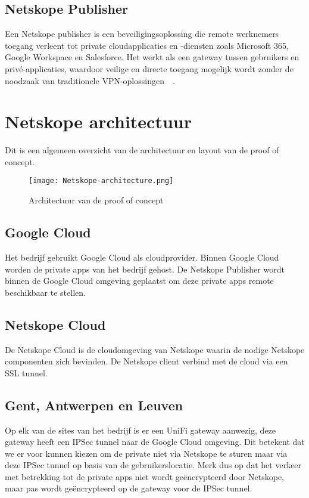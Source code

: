 \subsection{Netskope Publisher}
Een Netskope publisher is een beveiligingsoplossing die remote werknemers toegang verleent tot private cloudapplicaties en -diensten zoals Microsoft 365, Google Workspace en Salesforce. Het werkt als een gateway tussen gebruikers en privé-applicaties, waardoor veilige en directe toegang mogelijk wordt zonder de noodzaak van traditionele VPN-oplossingen~\autocite{Netskope2025-6}~\autocite{Netskope2025-7}.

\section{Netskope architectuur}
Dit is een algemeen overzicht van de architectuur en layout van de proof of concept. 
\begin{figure}
    \centering
    \texttt{[image: Netskope-architecture.png]}
    \caption[]{Architectuur van de proof of concept}
    \label{fig:poc-architecture}
\end{figure}
  
\subsection{Google Cloud}
Het bedrijf gebruikt Google Cloud als cloudprovider. Binnen Google Cloud worden de private apps van het bedrijf gehost. De Netskope Publisher wordt binnen de Google Cloud omgeving geplaatst om deze private apps remote beschikbaar te stellen.

\subsection{Netskope Cloud}
De Netskope Cloud is de cloudomgeving van Netskope waarin de nodige Netskope componenten zich bevinden. De Netskope client verbind met de cloud via een SSL tunnel.

\subsection{Gent, Antwerpen en Leuven}
Op elk van de sites van het bedrijf is er een UniFi gateway aanwezig, deze gateway heeft een IPSec tunnel naar de Google Cloud omgeving. Dit betekent dat we er voor kunnen kiezen om de private niet via Netskope te sturen maar via deze IPSec tunnel op basis van de gebruikerslocatie. Merk dus op dat het verkeer met betrekking tot de private apps niet wordt geëncrypteerd door Netskope, maar pas wordt geëncrypteerd op de gateway voor de IPSec tunnel.

